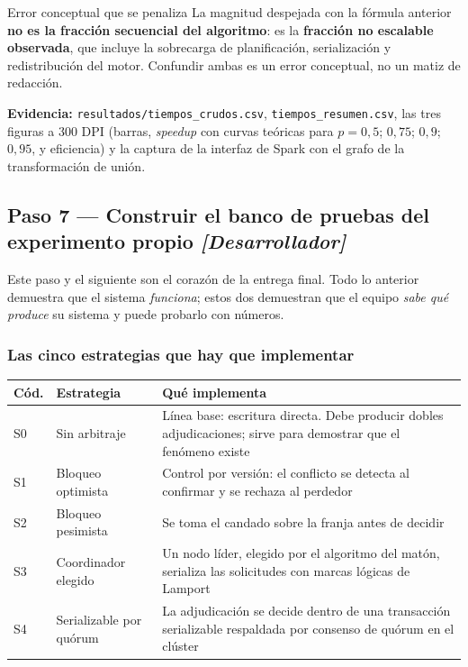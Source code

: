 \documentclass[11pt,a4paper]{article}
\newcommand{\paso}[1]{\subsection{#1}}
\begin{document}
	\begin{avisoBox}{Error conceptual que se penaliza}
		La magnitud despejada con la fórmula anterior \textbf{no es la fracción secuencial del algoritmo}: es la \textbf{fracción no escalable observada}, que incluye la sobrecarga de planificación, serialización y redistribución del motor. Confundir ambas es un error conceptual, no un matiz de redacción.
	\end{avisoBox}
	
	\textbf{Evidencia:} \texttt{resultados/tiempos\_crudos.csv}, \texttt{tiempos\_resumen.csv}, las tres figuras a 300 DPI (barras, \emph{speedup} con curvas teóricas para $p=0{,}5$; $0{,}75$; $0{,}9$; $0{,}95$, y eficiencia) y la captura de la interfaz de Spark con el grafo de la transformación de unión.
	
	\paso{Paso 7 --- Construir el banco de pruebas del experimento propio \emph{[Desarrollador]}}
	
	Este paso y el siguiente son el corazón de la entrega final. Todo lo anterior demuestra que el sistema \emph{funciona}; estos dos demuestran que el equipo \emph{sabe qué produce} su sistema y puede probarlo con números.
	
	\subsubsection{Las cinco estrategias que hay que implementar}
	
	\begin{center}
		\small
		\begin{tabular}{@{}p{1.0cm}p{4.4cm}p{9.5cm}@{}}
			\toprule
			\textbf{Cód.} & \textbf{Estrategia} & \textbf{Qué implementa} \\
			\midrule
			S0 & Sin arbitraje & Línea base: escritura directa. Debe producir dobles adjudicaciones; sirve para demostrar que el fenómeno existe \\
			S1 & Bloqueo optimista & Control por versión: el conflicto se detecta al confirmar y se rechaza al perdedor \\
			S2 & Bloqueo pesimista & Se toma el candado sobre la franja antes de decidir \\
			S3 & Coordinador elegido & Un nodo líder, elegido por el algoritmo del matón, serializa las solicitudes con marcas lógicas de Lamport \\
			S4 & Serializable por quórum & La adjudicación se decide dentro de una transacción serializable respaldada por consenso de quórum en el clúster \\
			\bottomrule
		\end{tabular}
	\end{center}
	
\end{document}
